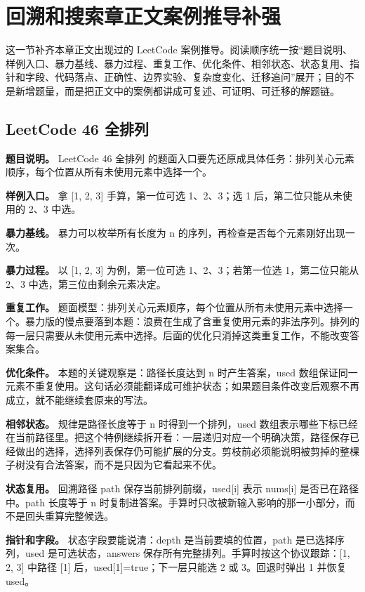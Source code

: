 \section{回溯和搜索章正文案例推导补强}

这一节补齐本章正文出现过的 LeetCode 案例推导。阅读顺序统一按“题目说明、样例入口、暴力基线、暴力过程、重复工作、优化条件、相邻状态、状态复用、指针和字段、代码落点、正确性、边界实验、复杂度变化、迁移追问”展开；目的不是新增题量，而是把正文中的案例都讲成可复述、可证明、可迁移的解题链。

\subsection{LeetCode 46 全排列}

\textbf{题目说明。} LeetCode 46 全排列 的题面入口要先还原成具体任务：排列关心元素顺序，每个位置从所有未使用元素中选择一个。

\textbf{样例入口。} 拿 [1, 2, 3] 手算，第一位可选 1、2、3；选 1 后，第二位只能从未使用的 2、3 中选。

\textbf{暴力基线。} 暴力可以枚举所有长度为 n 的序列，再检查是否每个元素刚好出现一次。

\textbf{暴力过程。} 以 [1, 2, 3] 为例，第一位可选 1、2、3；若第一位选 1，第二位只能从 2、3 中选，第三位由剩余元素决定。

\textbf{重复工作。} 题面模型：排列关心元素顺序，每个位置从所有未使用元素中选择一个。暴力版的慢点要落到本题：浪费在生成了含重复使用元素的非法序列。排列的每一层只需要从未使用元素中选择。后面的优化只消掉这类重复工作，不能改变答案集合。

\textbf{优化条件。} 本题的关键观察是：路径长度达到 n 时产生答案，used 数组保证同一元素不重复使用。这句话必须能翻译成可维护状态；如果题目条件改变后观察不再成立，就不能继续套原来的写法。

\textbf{相邻状态。} 规律是路径长度等于 n 时得到一个排列，used 数组表示哪些下标已经在当前路径里。把这个特例继续拆开看：一层递归对应一个明确决策，路径保存已经做出的选择，选择列表保存仍可能扩展的分支。剪枝前必须能说明被剪掉的整棵子树没有合法答案，而不是只因为它看起来不优。

\textbf{状态复用。} 回溯路径 path 保存当前排列前缀，used[i] 表示 nums[i] 是否已在路径中。path 长度等于 n 时复制进答案。手算时只改被新输入影响的那一小部分，而不是回头重算完整候选。

\textbf{指针和字段。} 状态字段要能说清：depth 是当前要填的位置，path 是已选择序列，used 是可选状态，answers 保存所有完整排列。手算时按这个协议跟踪：[1, 2, 3] 中路径 [1] 后，used[1]=true；下一层只能选 2 或 3。回退时弹出 1 并恢复 used。

